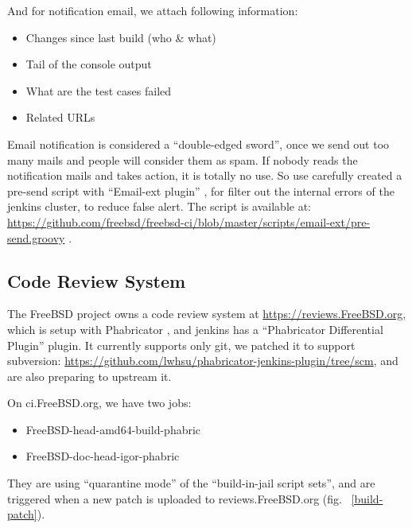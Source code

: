 \documentclass[a4paper,twocolumn,10pt]{article}
\begin{document}
And for notification email, we attach following information:
\begin{itemize}
\item Changes since last build (who \& what)
\item Tail of the console output
\item What are the test cases failed
\item Related URLs
\end{itemize}

Email notification is considered a ``double-edged sword'', once we send out too
many mails and people will consider them as spam. If nobody reads the
notification mails and takes action, it is totally no use. So use carefully
created a pre-send script with ``Email-ext plugin'' \cite{jenkins-email-ext},
for filter out the internal errors of the jenkins cluster, to reduce false
alert. The script is available at:
\url{https://github.com/freebsd/freebsd-ci/blob/master/scripts/email-ext/pre-send.groovy}
.

\subsection{Code Review System}

The FreeBSD project owns a code review system at \url{https://reviews.FreeBSD.org},
which is setup with Phabricator \cite{phabricator}, and jenkins has a
``Phabricator Differential Plugin''
\cite{jenkins-phabricator-differential-plugin} plugin. It currently supports
only git, we patched it to support subversion:
\url{https://github.com/lwhsu/phabricator-jenkins-plugin/tree/scm}, and are
also preparing to upstream it.

On ci.FreeBSD.org, we have two jobs:

\begin{itemize}
\item FreeBSD-head-amd64-build-phabric
\item FreeBSD-doc-head-igor-phabric
\end{itemize}

They are using ``quarantine mode'' of the ``build-in-jail script sets'', and
are triggered when a new patch is uploaded to reviews.FreeBSD.org (fig.
~\ref{build-patch}).
\end{document}

